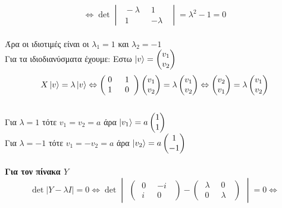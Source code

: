 \documentclass[12pt]{article}
\begin{document}
$$ \Leftrightarrow\det \begin{vmatrix}\;-\lambda \;\; & 1 \;\;\\ \;1 \;\; & -\lambda \;\;\end{vmatrix} = \lambda^2 -1=0 $$ \\
Άρα οι ιδιοτιμές είναι οι $\lambda_1 = 1$ και $\lambda_2=-1$ \\
Για τα ιδιοδιανύσματα έχουμε:
Εστω $\ket{v}=\begin{pmatrix} v_1 \\ v_2\end{pmatrix}$
$$X\ket{v}=\lambda\ket{ v} \Leftrightarrow \begin{pmatrix}\;0 \;\; & 1 \;\;\\ \;1 \;\; & 0 \;\;\end{pmatrix}\begin{pmatrix} v_1 \\ v_2\end{pmatrix}=\lambda\begin{pmatrix} v_1 \\ v_2\end{pmatrix} \Leftrightarrow 
\begin{pmatrix} v_2 \\ v_1\end{pmatrix} = \lambda \begin{pmatrix} v_1 \\ v_2\end{pmatrix}$$\\
Για $\lambda =1 $ τότε $v_1=v_2=a$ άρα $\ket{v_1} = a\begin{pmatrix} 1 \\ 1 \end{pmatrix}$\\
Για $\lambda =-1 $ τότε $v_1=-v_2=a$ άρα $\ket{v_2} = a\begin{pmatrix} 1 \\ -1 \end{pmatrix}$\\ \\
{\bf Για τον πίνακα $Y$}\\


$$ \det |Y-\lambda I| = 0 \Leftrightarrow \det \begin{vmatrix}\begin{pmatrix}\;0 \;\; & -i \;\;\\ \;i \;\; & 0 \;\;\end{pmatrix} -\begin{pmatrix}\;\lambda \;\; & 0 \;\;\\\;0 \;\; & \lambda \;\;\end{pmatrix}\end{vmatrix}  =0 \Leftrightarrow$$
\end{document}
